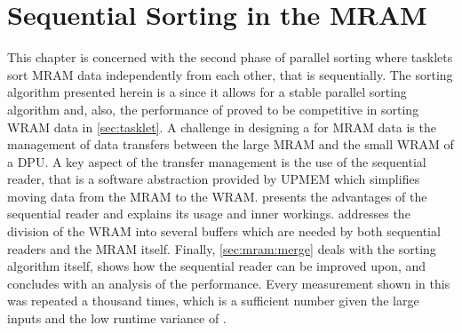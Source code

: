 \chapter{Sequential Sorting in the MRAM}
\label{sec:mram}

This chapter is concerned with the second phase of parallel sorting where tasklets sort MRAM data independently from each other, that is sequentially.
The sorting algorithm presented herein is a \MS{} since it allows for a stable parallel sorting algorithm and, also, the performance of \MS{} proved to be competitive in sorting WRAM data in \cref{sec:tasklet}.
A challenge in designing a \MS{} for MRAM data is the management of data transfers between the large MRAM and the small WRAM of a DPU.
A key aspect of the transfer management is the use of the sequential reader, that is a software abstraction provided by UPMEM which simplifies moving data from the MRAM to the WRAM.
 presents the advantages of the sequential reader and explains its usage and inner workings.
 addresses the division of the WRAM into several buffers which are needed by both sequential readers and the MRAM \MS{} itself.
Finally, \cref{sec:mram:merge} deals with the sorting algorithm itself, shows how the sequential reader can be improved upon, and concludes with an analysis of the performance.
Every measurement shown in this  was repeated a thousand times, which is a sufficient number given the large inputs and the low runtime variance of \MS{}.

%
%
%






